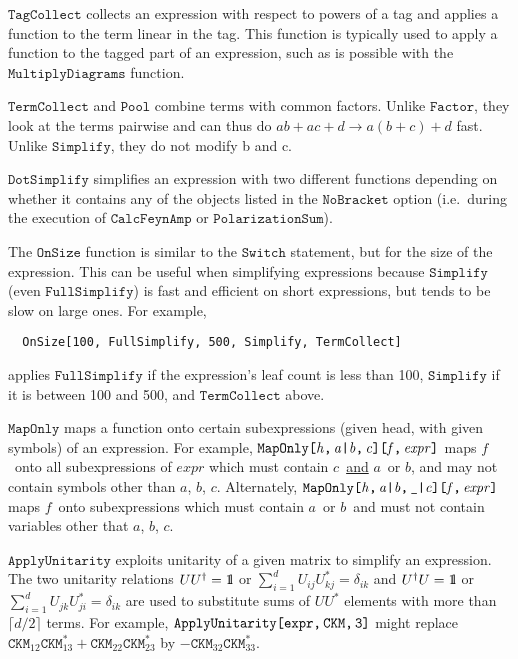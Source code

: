 \documentclass[twoside,11pt]{article}
\def\Var#1{\ensuremath{\mathit{#1}}}
\def\Va{\Var{a}}
\def\Vb{\Var{b}}
\def\Vc{\Var{c}}
\def\Vf{\Var{f}}
\def\Vh{\Var{h}}
\def\Code#1{\ensuremath{\texttt{#1}}}
\def\unity{{\rm 1\mskip-4.25mu l}}
\def\ie{i.e.\ }
\def\uscore{\symbol{95}}
\begin{document}
\Code{TagCollect} collects an expression with respect to powers of a tag
and applies a function to the term linear in the tag.  This function is
typically used to apply a function to the tagged part of an expression,
such as is possible with the \Code{MultiplyDiagrams} function.

\Code{TermCollect} and \Code{Pool} combine terms with common factors.  
Unlike \Code{Factor}, they look at the terms pairwise and can thus do $a b 
+ a c + d \to a (b + c) + d$ fast.  Unlike \Code{Simplify}, they do not 
modify b and c.

\Code{DotSimplify} simplifies an expression with two different functions
depending on whether it contains any of the objects listed in the
\Code{NoBracket} option (\ie during the execution of \Code{CalcFeynAmp}
or \Code{PolarizationSum}).

The \Code{OnSize} function is similar to the \Code{Switch} statement, 
but for the size of the expression.  This can be useful when simplifying 
expressions because \Code{Simplify} (even \Code{FullSimplify}) is fast 
and efficient on short expressions, but tends to be slow on large ones.  
For example,
\begin{verbatim}
  OnSize[100, FullSimplify, 500, Simplify, TermCollect]
\end{verbatim}
applies \Code{FullSimplify} if the expression's leaf count is less than 
100, \Code{Simplify} if it is between 100 and 500, and 
\Code{TermCollect} above.

\Code{MapOnly} maps a function onto certain subexpressions (given head, 
with given symbols) of an expression.  For example, 
\Code{MapOnly[\Vh,\,\Va|\Vb,\,\Vc][\Vf,\,\Var{expr}]} maps \Vf\ onto all 
subexpressions of \Var{expr} which must contain \Vc\ \underline{and} 
\Va\ or \Vb, and may not contain symbols other than \Va, \Vb, \Vc.  
Alternately, 
\Code{MapOnly[\Vh,\,\Va|\Vb,\,\uscore|\Vc][\Vf,\,\Var{expr}]} maps \Vf\ 
onto subexpressions which must contain \Va\ or \Vb\ and must not contain 
variables other that \Va, \Vb, \Vc.

\Code{ApplyUnitarity} exploits unitarity of a given matrix to simplify 
an expression.  The two unitarity relations $UU^\dagger = \unity$ or
$\sum_{i = 1}^d U_{ij} U_{kj}^* = \delta_{ik}$ and $U^\dagger U =
\unity$ or $\sum_{i = 1}^d U_{jk} U_{ji}^* = \delta_{ik}$ are used to
substitute sums of $UU^*$ elements with more than $\lceil d/2\rceil$
terms.  For example, \Code{ApplyUnitarity[expr,\,CKM,\,3]} might replace 
$\Code{CKM}_{12} \Code{CKM}_{13}^* + \Code{CKM}_{22} \Code{CKM}_{23}^*$ 
by $-\Code{CKM}_{32}\Code{CKM}_{33}^*$.
\end{document}
